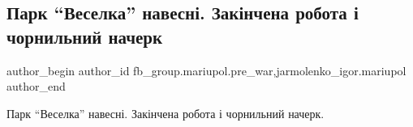  
 
 
 
 

\subsection{Парк \enquote{Веселка} навесні. Закінчена робота і чорнильний начерк}
\label{sec:09_01_2023.fb.fb_group.mariupol.pre_war.4.park__veselka__naves}
 
\ifcmt
 author_begin
   author_id fb_group.mariupol.pre_war,jarmolenko_igor.mariupol
 author_end
\fi

Парк \enquote{Веселка} навесні. Закінчена робота і чорнильний начерк.


